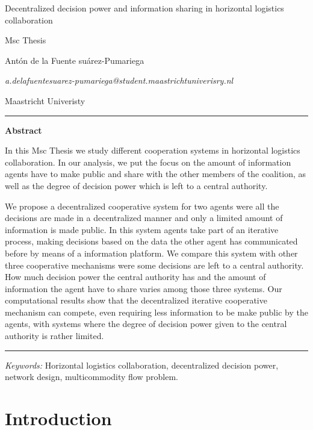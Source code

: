 \documentclass{article}
\begin{document}

\begin{center}

{\Large Decentralized decision power and information sharing in horizontal logistics collaboration} \\\medskip

Msc Thesis
\bigskip

Antón de la Fuente suárez-Pumariega
\medskip

\textit{a.delafuentesuarez-pumariega@student.maastrichtuniverisry.nl}
\bigskip

Maastricht Univeristy
\end{center}
\vspace{1cm}

\hrule
\medskip


\noindent\textbf{Abstract}
\medskip

\noindent In this Msc Thesis we study different cooperation systems in horizontal logistics collaboration. In our analysis, we put the focus on the amount of information agents have to make public and share with the other members of the coalition, as well as the degree of decision power which is left to a central authority. 

We propose a decentralized cooperative system for two agents were all the decisions are made in a decentralized manner and only a limited amount of information is made public. In this system agents take part of an iterative process, making decisions based on the data the other agent has communicated before by means of a information platform. We compare this system with other three cooperative mechanisms were some decisions are left to a central authority. How much decision power the central authority has and the amount of information the agent have to share varies among those three systems. Our computational results show that the decentralized iterative cooperative mechanism can compete, even requiring less information to be make public by the agents, with systems where the degree of decision power given to the central authority is rather limited.


\bigskip
\hrule
\bigskip

\textit{Keywords:} Horizontal logistics collaboration, decentralized decision power, network design, multicommodity flow problem.

\section{Introduction}
\end{document}
